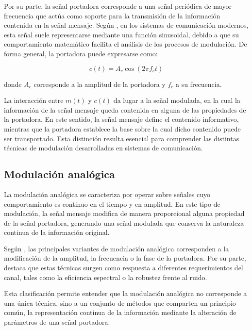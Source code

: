 Por su parte, la señal portadora corresponde a una señal periódica de mayor frecuencia que actúa como soporte para la transmisión de la información contenida en la señal mensaje. Según \cite{lathi2009modern}, en los sistemas de comunicación modernos, esta señal suele representarse mediante una función sinusoidal, debido a que su comportamiento matemático facilita el análisis de los procesos de modulación. De forma general, la portadora puede expresarse como:

\begin{equation}
c(t) = A_c \cos(2\pi f_c t)
\label{eq:carrier}
\end{equation}

donde $A_c$ corresponde a la amplitud de la portadora y $f_c$ a su frecuencia.

La interacción entre $m(t)$ y $c(t)$ da lugar a la señal modulada, en la cual la información de la señal mensaje queda contenida en alguna de las propiedades de la portadora. En este sentido, la señal mensaje define el contenido informativo, mientras que la portadora establece la base sobre la cual dicho contenido puede ser transportado. Esta distinción resulta esencial para comprender las distintas técnicas de modulación desarrolladas en sistemas de comunicación.

\subsection{Modulación analógica}

La modulación analógica se caracteriza por operar sobre señales cuyo comportamiento es continuo en el tiempo y en amplitud. En este tipo de modulación, la señal mensaje modifica de manera proporcional alguna propiedad de la señal portadora, generando una señal modulada que conserva la naturaleza continua de la información original.

Según \cite{haykin2001}, las principales variantes de modulación analógica corresponden a la modificación de la amplitud, la frecuencia o la fase de la portadora. Por su parte, \cite{lathi2009modern} destaca que estas técnicas surgen como respuesta a diferentes requerimientos del canal, tales como la eficiencia espectral o la robustez frente al ruido.

Esta clasificación permite entender que la modulación analógica no corresponde a una única técnica, sino a un conjunto de métodos que comparten un principio común, la representación continua de la información mediante la alteración de parámetros de una señal portadora.

